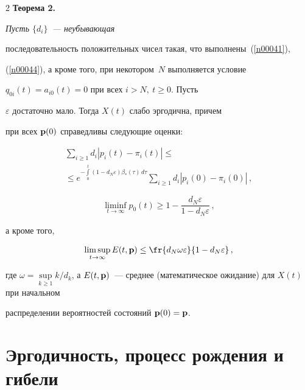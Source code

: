 \begin{multicols}{2}
{\bf Теорема 2. } {\it Пусть $\{d_i\}$~--- неубывающая


последовательность положительных чисел такая, что выполнены~(\ref{n00041}), 


(\ref{n00044}),  а кроме того, при некотором~$N$ выполняется условие


$q_{0i}(t)=a_{i0}(t)=0$ при всех $i > N, \ t \ge 0$. Пусть


$\varepsilon$ достаточно мало. Тогда $X(t)$ слабо эргодична, причем


при всех ${\bf p}(0)$ справедливы следующие оценки:


\begin{multline*}


\sum_{i \ge 1} d_i \left|p_i(t) - \pi_i(t)\right|  \le{}\\


{}\le


e^{-\int\limits_0^t\left(1- d_N\varepsilon\right) \beta_* (\tau)\, d\tau}


\sum_{i \ge 1} d_i \left|p_i(0) - \pi_i(0)\right| \,, 




\end{multline*}


\begin{equation*}


\liminf_{t \to \infty} p_0(t) \ge 1 -


 \frac{d_N\varepsilon}{1-d_N\varepsilon}\,,




\end{equation*}


а кроме того,


\begin{equation*}


\limsup_{t \to \infty} E(t,{\bf p}) \le


 \fr{d_N\omega\varepsilon}{1-d_N\varepsilon }\,,




\end{equation*}


где $\omega = \sup\limits_{k \ge 1} k/d_k$, а $E(t,{\bf


p})$~--- среднее (математическое ожидание) для $X(t)$ при начальном


распределении вероятностей состояний ${\bf p}(0) = {\bf p}$.}





\section{Эргодичность, процесс рождения и гибели}






\end{multicols}
